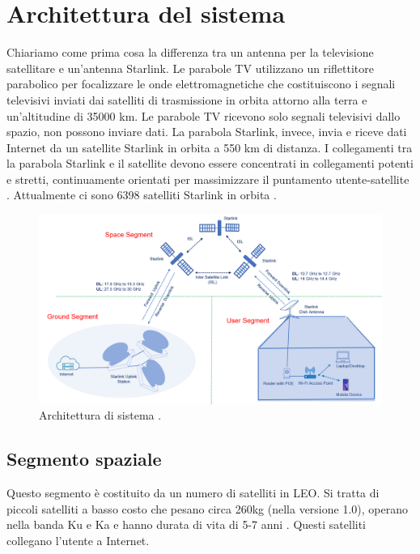 
\chapter{Architettura del sistema}

Chiariamo come prima cosa la differenza tra un antenna per la televisione satellitare e un'antenna Starlink.
Le parabole TV utilizzano un riflettitore parabolico per focalizzare le onde elettromagnetiche che costituiscono i segnali televisivi inviati dai satelliti di trasmissione in orbita attorno alla terra e un'altitudine di 35000 km.
Le parabole TV ricevono solo segnali televisivi dallo spazio, non possono inviare dati.
La parabola Starlink, invece, invia e riceve dati Internet da un satellite Starlink in orbita a 550 km di distanza.
I collegamenti tra la parabola Starlink e il satellite devono essere concentrati in collegamenti potenti e stretti, continuamente orientati per massimizzare il puntamento utente-satellite \cite{branch_education_how_2022}.
Attualmente ci sono 6398 satelliti Starlink in orbita \cite{jonathan_mcdowell_starlink_nodate}.

\begin{figure}[htbp]
  \centering
  \includegraphics[width=0.9\linewidth]{./res/img/starlink-system-architecture.png}
  \caption{Architettura di sistema \cite{techplayon_spacex_2024}.}
  \label{fig:starlink-system-architecture}
\end{figure}

\section{Segmento spaziale}
Questo segmento è costituito da un numero di satelliti in \ac{LEO}. Si tratta di piccoli satelliti a basso costo che pesano circa 260kg (nella versione 1.0), operano nella banda \ac{Ku} e \ac{Ka} e hanno durata di vita di 5-7 anni \cite{techplayon_spacex_2024}. Questi satelliti collegano l'utente a Internet.

